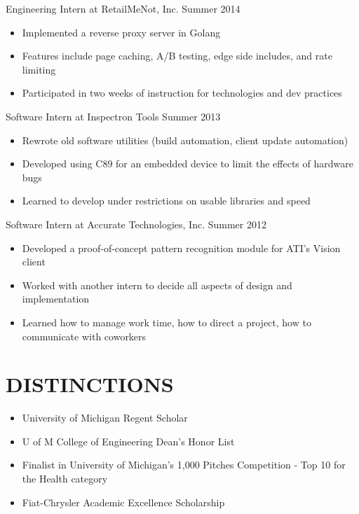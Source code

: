 \documentclass[line,margin]{res}
\begin{document}
\begin{resume}
                {\sc Engineering Intern at RetailMeNot, Inc.} \hfill Summer 2014
                 \begin{itemize}  \itemsep -2pt %
                 \item Implemented a reverse proxy server in Golang
                 \item Features include page caching, A/B testing, edge side includes, and rate limiting
                 \item Participated in two weeks of instruction for technologies and dev practices
                 \end{itemize}

                {\sc Software Intern at Inspectron Tools} \hfill Summer 2013
                 \begin{itemize}  \itemsep -2pt %
                 \item Rewrote old software utilities (build automation, client update automation)
                 \item Developed using C89 for an embedded device to limit the effects of hardware bugs
                 \item Learned to develop under restrictions on usable libraries and speed
                 \end{itemize}
 
                {\sc Software Intern at Accurate Technologies, Inc.} \hfill            Summer 2012
                 \begin{itemize}  \itemsep -2pt %
                 \item Developed a proof-of-concept pattern recognition module for ATI’s Vision client
                 \item Worked with another intern to decide all aspects of design and implementation
                 \item Learned how to manage work time, how to direct a project, how to communicate with coworkers
                 \end{itemize} 

\section{\textcolor{HeaderColor}{DISTINCTIONS}}
    \begin{itemize} \itemsep-0.2em
    \item University of Michigan Regent Scholar
    \item U of M College of Engineering Dean’s Honor List
    \item Finalist in University of Michigan's 1,000 Pitches Competition - Top 10 for the Health category
    \item Fiat-Chrysler Academic Excellence Scholarship
    \end{itemize}
 

\end{resume}
\end{document}
